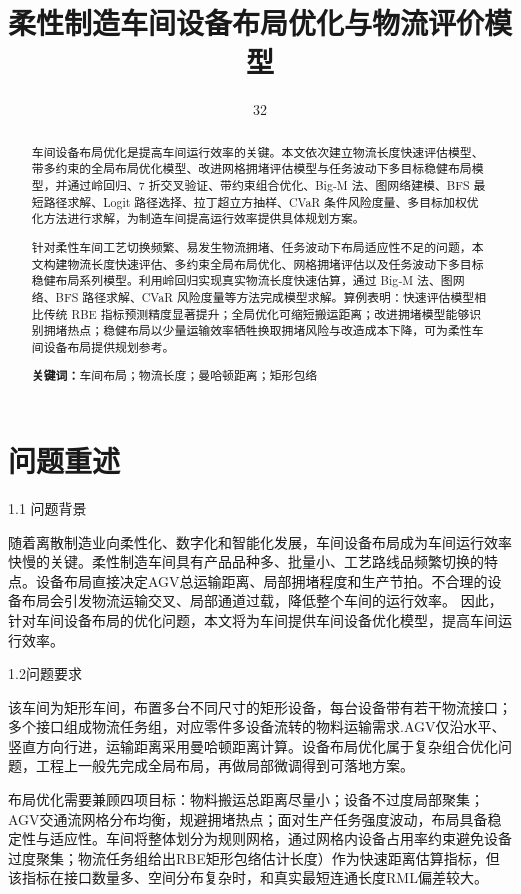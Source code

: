 \documentclass[12pt,a4paper]{article}
\title{柔性制造车间设备布局优化与物流评价模型}
\author{32}
\date{}  %
\begin{document}
	\maketitle
	
	\begin{abstract}
		车间设备布局优化是提高车间运行效率的关键。本文依次建立物流长度快速评估模型、带多约束的全局布局优化模型、改进网格拥堵评估模型与任务波动下多目标稳健布局模型，并通过岭回归、7 折交叉验证、带约束组合优化、Big‑M 法、图网络建模、BFS 最短路径求解、Logit 路径选择、拉丁超立方抽样、CVaR 条件风险度量、多目标加权优化方法进行求解，为制造车间提高运行效率提供具体规划方案。
		
		针对柔性车间工艺切换频繁、易发生物流拥堵、任务波动下布局适应性不足的问题，本文构建物流长度快速评估、多约束全局布局优化、网格拥堵评估以及任务波动下多目标稳健布局系列模型。利用岭回归实现真实物流长度快速估算，通过 Big‑M 法、图网络、BFS 路径求解、CVaR 风险度量等方法完成模型求解。算例表明：快速评估模型相比传统 RBE 指标预测精度显著提升；全局优化可缩短搬运距离；改进拥堵模型能够识别拥堵热点；稳健布局以少量运输效率牺牲换取拥堵风险与改造成本下降，可为柔性车间设备布局提供规划参考。
			
		\textbf{关键词：}车间布局；物流长度；曼哈顿距离；矩形包络
	\end{abstract}
	
	\section{问题重述}
	1.1 问题背景
	
	随着离散制造业向柔性化、数字化和智能化发展，车间设备布局成为车间运行效率快慢的关键。柔性制造车间具有产品品种多、批量小、工艺路线品频繁切换的特点。设备布局直接决定AGV总运输距离、局部拥堵程度和生产节拍。不合理的设备布局会引发物流运输交叉、局部通道过载，降低整个车间的运行效率。
	因此，针对车间设备布局的优化问题，本文将为车间提供车间设备优化模型，提高车间运行效率。
	
	1.2问题要求
	
	该车间为矩形车间，布置多台不同尺寸的矩形设备，每台设备带有若干物流接口；多个接口组成物流任务组，对应零件多设备流转的物料运输需求.AGV仅沿水平、竖直方向行进，运输距离采用曼哈顿距离计算。设备布局优化属于复杂组合优化问题，工程上一般先完成全局布局，再做局部微调得到可落地方案。
	
	布局优化需要兼顾四项目标：物料搬运总距离尽量小；设备不过度局部聚集；AGV交通流网格分布均衡，规避拥堵热点；面对生产任务强度波动，布局具备稳定性与适应性。车间将整体划分为规则网格，通过网格内设备占用率约束避免设备过度聚集；物流任务组给出RBE矩形包络估计长度）作为快速距离估算指标，但该指标在接口数量多、空间分布复杂时，和真实最短连通长度RML偏差较大。
	
\end{document}
